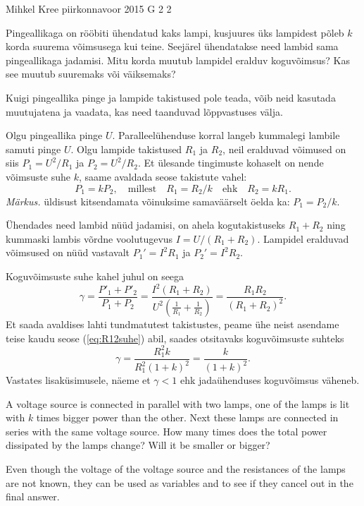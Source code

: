 {Mihkel Kree} %
{piirkonnavoor} %
{2015} %
{G 2} %
{2} %
{
\ifStatement
Pingeallikaga on rööbiti ühendatud kaks lampi, kusjuures üks lampidest põleb $k$ korda suurema võimsusega kui teine. Seejärel ühendatakse need lambid sama pingeallikaga jadamisi. Mitu korda muutub lampidel eralduv koguvõimsus? Kas see muutub suuremaks või väiksemaks?
\pagebreak
\fi


\ifHint
Kuigi pingeallika pinge ja lampide takistused pole teada, võib neid kasutada muutujatena ja vaadata, kas need taanduvad lõppvastuses välja.
\fi


\ifSolution
Olgu pingeallika pinge $U$. Paralleelühenduse korral langeb kummalegi lambile samuti pinge $U$. Olgu lampide takistused $R_1$ ja $R_2$, neil eralduvad võimused on siis $P_1=U^2/R_1$ ja $P_2=U^2/R_2$. Et ülesande tingimuste kohaselt on nende võimsuste suhe $k$, saame avaldada seose takistute vahel:
\begin{equation}
\label{eq:R12suhe}
P_1 = kP_2, \quad \text{millest} \quad R_1 = R_2/k \quad \text{ehk} \quad R_2=kR_1.
\end{equation}
\emph{Märkus.} üldisust kitsendamata võinuksime samaväärselt öelda ka: $P_1 = P_2/k$.

Ühendades need lambid nüüd jadamisi, on ahela kogutakistuseks $R_1+R_2$ ning kummaski lambis võrdne voolutugevus $I=U/(R_1+R_2)$. Lampidel eralduvad võimsused on nüüd vastavalt $P_1'=I^2R_1$ ja $P_2'=I^2R_2$.

Koguvõimsuste suhe kahel juhul on seega
\[
\gamma = \frac{P'_1+P'_2}{P_1+P_2} = \frac{I^2(R_1+R_2)}{U^2(\frac{1}{R_1}+\frac{1}{R_2})}=
\frac{R_1R_2}{(R_1+R_2)^2}.
\]
Et saada avaldises lahti tundmatutest takistustes, peame ühe neist asendame teise kaudu seose (\ref{eq:R12suhe}) abil, saades otsitavaks koguvõimsuste suhteks
\[
\gamma = \frac{R_1^2 k}{R_1^2(1+k)^2} = \frac{k}{(1+k)^2}.
\]
Vastates lisaküsimusele, näeme et $\gamma < 1$ ehk jadaühenduses koguvõimsus väheneb.
\fi


\ifEngStatement
A voltage source is connected in parallel with two lamps, one of the lamps is lit with $k$ times bigger power than the other. Next these lamps are connected in series with the same voltage source. How many times does the total power dissipated by the lamps change? Will it be smaller or bigger?
\fi


\ifEngHint
Even though the voltage of the voltage source and the resistances of the lamps are not known, they can be used as variables and to see if they cancel out in the final answer.
\fi


}
